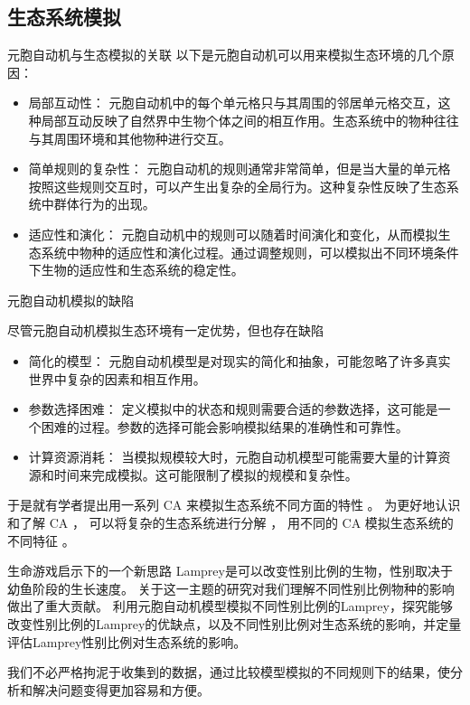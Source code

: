 \documentclass{beamer}
\begin{document}
\subsection{生态系统模拟}


\begin{frame}{元胞自动机与生态模拟的关联}
以下是元胞自动机可以用来模拟生态环境的几个原因：
\begin{itemize}
    \item 局部互动性： 元胞自动机中的每个单元格只与其周围的邻居单元格交互，这种局部互动反映了自然界中生物个体之间的相互作用。生态系统中的物种往往与其周围环境和其他物种进行交互。
    \item 简单规则的复杂性： 元胞自动机的规则通常非常简单，但是当大量的单元格按照这些规则交互时，可以产生出复杂的全局行为。这种复杂性反映了生态系统中群体行为的出现。
    \item 适应性和演化： 元胞自动机中的规则可以随着时间演化和变化，从而模拟生态系统中物种的适应性和演化过程。通过调整规则，可以模拟出不同环境条件下生物的适应性和生态系统的稳定性。
\end{itemize}

\end{frame}


\begin{frame}{元胞自动机模拟的缺陷}
\begin{block}{尽管元胞自动机模拟生态环境有一定优势，但也存在缺陷}
    \begin{itemize}
    \item 简化的模型： 元胞自动机模型是对现实的简化和抽象，可能忽略了许多真实世界中复杂的因素和相互作用。
    \item 参数选择困难： 定义模拟中的状态和规则需要合适的参数选择，这可能是一个困难的过程。参数的选择可能会影响模拟结果的准确性和可靠性。
    \item 计算资源消耗： 当模拟规模较大时，元胞自动机模型可能需要大量的计算资源和时间来完成模拟。这可能限制了模拟的规模和复杂性。
\end{itemize}
\end{block}

于是就有学者提出用一系列 CA 来模拟生态系统不同方面的特性 。 为更好地认识和了解 CA ， 可以将复杂的生态系统进行分解 ， 用不同的 CA 模拟生态系统的不同特征 。

\end{frame}


\begin{frame}{生命游戏启示下的一个新思路}
\hspace{2em} Lamprey是可以改变性别比例的生物，性别取决于幼鱼阶段的生长速度。
关于这一主题的研究对我们理解不同性别比例物种的影响做出了重大贡献。
利用元胞自动机模型模拟不同性别比例的Lamprey，探究能够改变性别比例的Lamprey的优缺点，以及不同性别比例对生态系统的影响，并定量评估Lamprey性别比例对生态系统的影响。

\hspace*{\fill}

\hspace{2em}我们不必严格拘泥于收集到的数据，通过比较模型模拟的不同规则下的结果，使分析和解决问题变得更加容易和方便。
\end{frame}
\end{document}
